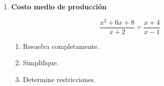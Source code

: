 \documentclass[11pt]{article}
\begin{document}
\begin{enumerate}
				\item \textbf{Costo medio de producción}
				
				\[
				\frac{x^2+6x+8}{x+2}\div\frac{x+4}{x-1}
				\]
				
				\begin{enumerate}[label=\alph*)]
					\item Resuelva completamente.
					\item Simplifique.
					\item Determine restricciones.
				\end{enumerate}
				
				
				
				
			\end{enumerate}
			
\end{document}
